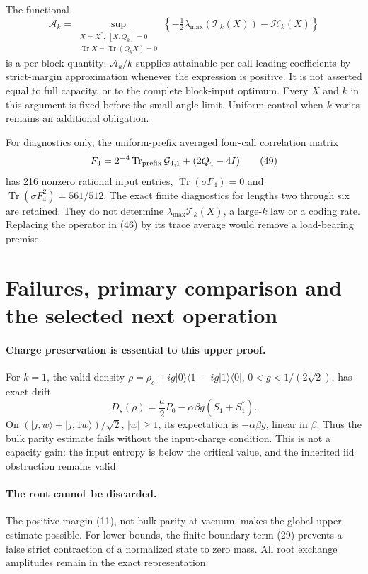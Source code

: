 \documentclass[11pt]{article}
\newcommand{\Tr}{\operatorname{Tr}}
\begin{document}
The functional
\[
 \mathcal A_k=
 \sup_{\substack{X=X^*,\ [X,Q_k]=0\\
                  \Tr X=\Tr(Q_kX)=0}}
 \left\{-\tfrac12\lambda_{\max}(\mathcal T_k(X))
              -\mathcal H_k(X)\right\}
 \tag{48}
\]
is a per-block quantity; $\mathcal A_k/k$ supplies attainable per-call
leading coefficients by strict-margin approximation whenever the expression
is positive.
It is not asserted equal to full capacity, or to the complete block-input
optimum. Every $X$ and $k$ in this argument is fixed before the small-angle
limit. Uniform control when $k$ varies remains an additional obligation.

For diagnostics only, the uniform-prefix averaged four-call correlation
matrix
\[
 F_4=2^{-4}\Tr_{\rm prefix}\mathcal G_{4,1}+(2Q_4-4I)
 \tag{49}
\]
has 216 nonzero rational input entries,
$\Tr(\sigma F_4)=0$ and $\Tr(\sigma F_4^2)=561/512$.
The exact finite diagnostics for lengths two through six are retained.
They do not determine $\lambda_{\max}\mathcal T_k(X)$, a large-$k$
law or a coding rate. Replacing the operator in (46) by its trace
average would remove a load-bearing premise.

\section{Failures, primary comparison and the selected next operation}

\paragraph{Charge preservation is essential to this upper proof.}
For $k=1$, the valid density
$\rho=\rho_c+ig|0\rangle\langle1|-ig|1\rangle\langle0|$,
$0<g<1/(2\sqrt2)$, has exact drift
\[
 D_s(\rho)=\frac a2P_0-\alpha\beta g(S_1+S_1^*).
 \tag{50}
\]
On $(|j,w\rangle+|j,1w\rangle)/\sqrt2$, $|w|\ge1$, its expectation
is $-\alpha\beta g$, linear in $\beta$. Thus the bulk parity estimate
fails without the input-charge condition. This is not a capacity gain:
the input entropy is below the critical value, and the inherited iid
obstruction remains valid.

\paragraph{The root cannot be discarded.}
The positive margin (11), not bulk parity at vacuum, makes the global
upper estimate possible. For lower bounds, the finite boundary term (29)
prevents a false strict contraction of a normalized state to zero mass.
All root exchange amplitudes remain in the exact representation.
\end{document}
